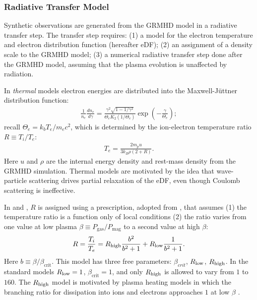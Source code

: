 \subsubsection{Radiative Transfer Model}

Synthetic observations are generated from the GRMHD model in a radiative transfer step.  The transfer step requires: (1) a model for the electron temperature and electron distribution function (hereafter eDF); (2) an assignment of a density scale to the GRMHD model; (3) a numerical radiative transfer step done after the GRMHD model, assuming that the plasma evolution is unaffected by radiation.


In {\it thermal} models electron energies are distributed into the Maxwell-J{\"u}ttner distribution function:
\begin{align}
\frac{1}{n_e}\frac{dn_e}{d\gamma}= \frac{\gamma^2 \sqrt{1-1/\gamma^2}} {\Theta_e K_2(1/\Theta_e)} \exp\left(-\frac{\gamma}{\Theta_e}\right);
\end{align}
recall $\Theta_e=k_b T_e/m_e c^2$, which is determined by the ion-electron temperature ratio $R \equiv T_i/T_e$:
\begin{align}
T_e=\frac{2 m_p u}{3 k_B \rho (2+R)}.
\end{align}
Here $u$ and $\rho$ are the internal energy density and rest-mass density from the GRMHD simulation.  Thermal models are motivated by the idea that wave-particle scattering drives partial relaxation of the eDF, even though Coulomb scattering is ineffective.

In  and , $R$ is assigned using a prescription, adopted from \cite{2016A&A...586A..38M}, that assumes (1) the temperature ratio is a function only of local conditions (2) the ratio varies from one value at low plasma $\beta \equiv P_\mathrm{gas}/P_\mathrm{mag}$ to a second value at high $\beta$:
\begin{equation}
R = \frac{T_i}{T_e} = \Rh \frac{b^2}{b^2+1} + \Rl \frac{1}{b^2+1}.
\end{equation}
Here $b \equiv \beta/\beta_\mathrm{crit}$. This model has three free parameters: $\beta_{crit}$, $R_\mathrm{low}$, $R_\mathrm{high}$.  In the standard models $R_\mathrm{low} = 1$, $\beta_\mathrm{crit} = 1$, and only $R_\mathrm{high}$ is allowed to vary from $1$ to $160$.  The $R_\mathrm{high}$ model is motivated by plasma heating models in which the branching ratio for dissipation into ions and electrons approaches $1$ at low $\beta$ \citep[e.g.,][]{2010MNRAS.409L.104H,Kawazura771}.

